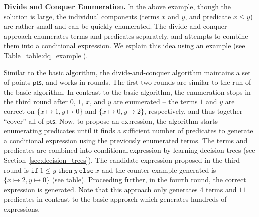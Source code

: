 \documentclass{llncs}
\newcommand\Points{\mathsf{pts}}
\newcommand\ITE[3]{\mathtt{if}~#1~\mathtt{then}~#2~\mathtt{else}~#3}
\renewcommand{\paragraph}[1]{\par\noindent\textbf{#1.}}
\begin{document}
\paragraph{Divide and Conquer Enumeration}
In the above example, though the solution is large, the
individual components (terms $x$ and $y$, and predicate $x \leq
y$) are rather small and can be quickly enumerated.
%
The divide-and-conquer approach enumerates terms and predicates
separately, and attempts to combine them into a conditional expression.
We explain this idea using an example (see Table~\ref{table:dq_example}).

Similar to the basic algorithm, the divide-and-conquer algorithm
maintains a set of points $\Points$, and works in rounds.
The first two rounds are similar to the run of the basic algorithm.
In contrast to the basic algorithm, the enumeration stops in the third
round after $0$, $1$, $x$, and $y$ are enumerated -- the terms $1$ and
$y$ are correct on $\{ x \mapsto 1, y \mapsto 0 \}$ and $\{ x \mapsto 0,
y \mapsto 2 \}$, respectively, and thus together ``cover'' all of $\Points$.
Now, to propose an expression, the algorithm starts enumerating
predicates until it finds a sufficient number of predicates to generate
a conditional expression using the previously enumerated terms.
The terms and predicates are combined into conditional expression by
learning decision trees (see Section~\ref{sec:decision_trees}).
The candidate expression proposed in the third round is
$\ITE{1 \leq y}{y}{x}$ and the counter-example generated is
$\{ x \mapsto 2, y \mapsto 0 \}$ (see table).
Proceeding further, in the fourth round, the correct expression is
generated.
Note that this approach only generates $4$ terms and $11$ predicates in
contrast to the basic approach which generates hundreds of
expressions.
\end{document}
